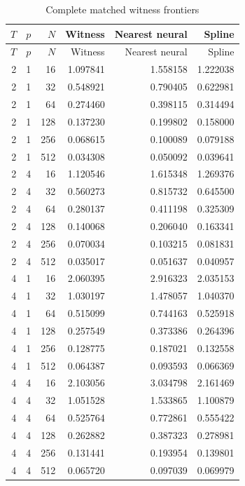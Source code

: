 \begin{longtable}{rrrrrr}
\caption{Complete matched witness frontiers}\label{tab:witnessfront46}\\
\toprule $T$ & $p$ & $N$ & Witness & Nearest neural & Spline \\ \midrule\endfirsthead
\toprule $T$ & $p$ & $N$ & Witness & Nearest neural & Spline \\ \midrule\endhead
2 & 1 & 16 & 1.097841 & 1.558158 & 1.222038 \\
2 & 1 & 32 & 0.548921 & 0.790405 & 0.622981 \\
2 & 1 & 64 & 0.274460 & 0.398115 & 0.314494 \\
2 & 1 & 128 & 0.137230 & 0.199802 & 0.158000 \\
2 & 1 & 256 & 0.068615 & 0.100089 & 0.079188 \\
2 & 1 & 512 & 0.034308 & 0.050092 & 0.039641 \\
2 & 4 & 16 & 1.120546 & 1.615348 & 1.269376 \\
2 & 4 & 32 & 0.560273 & 0.815732 & 0.645500 \\
2 & 4 & 64 & 0.280137 & 0.411198 & 0.325309 \\
2 & 4 & 128 & 0.140068 & 0.206040 & 0.163341 \\
2 & 4 & 256 & 0.070034 & 0.103215 & 0.081831 \\
2 & 4 & 512 & 0.035017 & 0.051637 & 0.040957 \\
4 & 1 & 16 & 2.060395 & 2.916323 & 2.035153 \\
4 & 1 & 32 & 1.030197 & 1.478057 & 1.040370 \\
4 & 1 & 64 & 0.515099 & 0.744163 & 0.525918 \\
4 & 1 & 128 & 0.257549 & 0.373386 & 0.264396 \\
4 & 1 & 256 & 0.128775 & 0.187021 & 0.132558 \\
4 & 1 & 512 & 0.064387 & 0.093593 & 0.066369 \\
4 & 4 & 16 & 2.103056 & 3.034798 & 2.161469 \\
4 & 4 & 32 & 1.051528 & 1.533865 & 1.100879 \\
4 & 4 & 64 & 0.525764 & 0.772861 & 0.555422 \\
4 & 4 & 128 & 0.262882 & 0.387323 & 0.278981 \\
4 & 4 & 256 & 0.131441 & 0.193954 & 0.139801 \\
4 & 4 & 512 & 0.065720 & 0.097039 & 0.069979 \\
\bottomrule\end{longtable}
